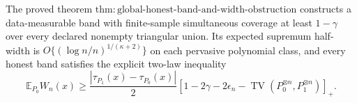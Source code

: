 The proved theorem \(\mathrm{thm:global\text{-}honest\text{-}band\text{-}and\text{-}width\text{-}obstruction}\) constructs a data-measurable band with finite-sample simultaneous coverage at least \(1-\gamma\) over every declared nonempty triangular union.  Its expected supremum half-width is \(O\{(\log n/n)^{1/(\kappa+2)}\}\) on each pervasive polynomial class, and every honest band satisfies the explicit two-law inequality
\[
 \mathbb E_{P_0}W_n(x)\ge \frac{|\tau_{P_1}(x)-\tau_{P_0}(x)|}{2}
 \left[1-2\gamma-2\epsilon_n-
 \operatorname{TV}(P_0^{\otimes n},P_1^{\otimes n})\right]_+.
\]
